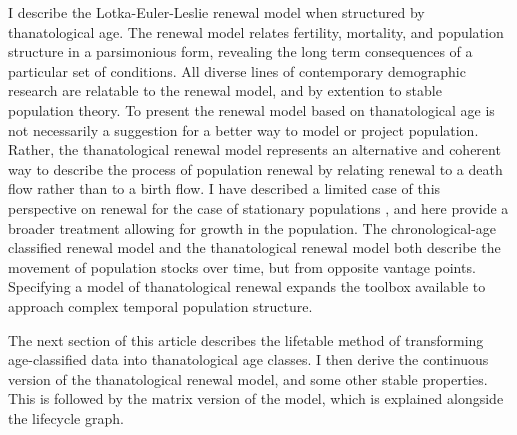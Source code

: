 \documentclass{article}
\begin{document}
I describe the Lotka-Euler-Leslie renewal model when structured by
thanatological age. The renewal model relates
fertility, mortality, and population structure in a parsimonious form, revealing the long term consequences of a particular set of conditions. All diverse lines of contemporary demographic research are relatable to the renewal model, and by extention to stable population theory.
To present the renewal model based on thanatological age is not necessarily a
suggestion for a better way to model or project population. Rather, the
thanatological renewal model represents an alternative and coherent way to
describe the process of population renewal by relating renewal to a death flow
rather than to a birth flow. I have described a limited case of this
perspective on renewal for the case of stationary populations
\citep{riffe2015force}, and here provide a broader treatment allowing for
growth in the population.
The chronological-age classified renewal model and the thanatological renewal model both describe the movement of population stocks over time, but from opposite vantage points. Specifying a model of thanatological renewal expands the toolbox available to approach complex
temporal population structure. 

The next section of this article describes the lifetable method of transforming age-classified
data into thanatological age classes. I then derive the continuous version of
the thanatological renewal model, and some other stable properties. This is
followed by the matrix version of the model, which is explained alongside the
lifecycle graph. 
\end{document}
